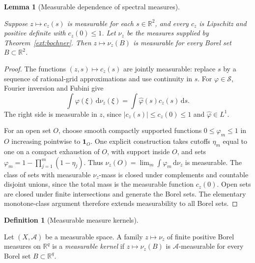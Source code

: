 \documentclass[11pt]{amsart}
\newcommand{\R}{\mathbb R}
\newcommand{\dd}{\,\mathrm d}
\newcommand{\one}{\mathbf 1}
\newtheorem{lemma}[theorem]{Lemma}
\theoremstyle{definition}
\newtheorem{definition}[theorem]{Definition}
\theoremstyle{remark}
\numberwithin{equation}{section}
\providecommand{\lean}[1]{}
\providecommand{\leanok}{}
\begin{document}
\begin{lemma}[Measurable dependence of spectral measures]
\label{ext:measurable-spectral}
\lean{Auto.ext_measurable_spectral}
\leanok
Suppose $z\mapsto c_z(s)$ is measurable for each $s\in\R^2$,
and every $c_z$ is Lipschitz and positive definite with
$c_z(0)\le1$.  Let $\nu_z$ be the measures supplied by
Theorem~\ref{ext:bochner}.  Then $z\mapsto\nu_z(B)$ is
measurable for every Borel set $B\subset\R^2$.
\end{lemma}
\begin{proof}
The functions $(z,s)\mapsto c_z(s)$ are jointly measurable:
replace $s$ by a sequence of rational-grid approximations
and use continuity in $s$.  For $\varphi\in\mathcal S$,
Fourier inversion and Fubini give
\[
 \int\varphi(\xi)\dd\nu_z(\xi)
      =\int\widehat\varphi(s)c_z(s)\dd s.
\]
The right side is measurable in $z$, since
$|c_z(s)|\le c_z(0)\le1$ and $\widehat\varphi\in L^1$.

For an open set $O$, choose smooth compactly supported
functions $0\le\varphi_m\le1$ in $O$ increasing pointwise
to $\one_O$.  One explicit construction takes cutoffs
$\eta_m$ equal to one on a compact exhaustion of $O$, with
support inside $O$, and sets
$\varphi_m=1-\prod_{j=1}^m(1-\eta_j)$.
Thus $\nu_z(O)=\lim_m\int\varphi_m\dd\nu_z$ is measurable.
The class of sets with measurable $\nu_z$-mass is closed
under complements and countable disjoint unions, since the
total mass is the measurable function $c_z(0)$.  Open sets
are closed under finite intersections and generate the
Borel sets.  The elementary monotone-class argument therefore
extends measurability to all Borel sets.
\end{proof}

\begin{definition}[Measurable measure kernels]\label{ext:kernel-definition}
\lean{Auto.IsMeasurableKernel}
Let $(X,\mathcal A)$ be a measurable space.  A family
$z\mapsto\nu_z$ of finite positive Borel measures on $\R^q$ is a
\emph{measurable kernel} if $z\mapsto\nu_z(B)$ is
$\mathcal A$-measurable for every Borel set $B\subset\R^q$.
\end{definition}
\end{document}
